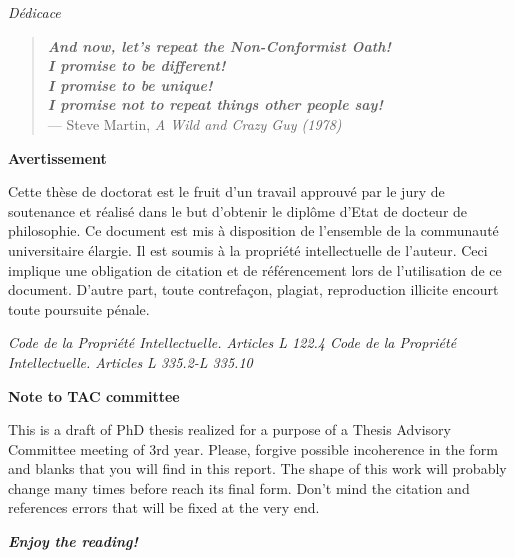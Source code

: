 \documentclass[12pt,]{book}
\theoremstyle{definition}
\theoremstyle{definition}
\theoremstyle{definition}
\theoremstyle{remark}
\begin{document}
\begin{titlepage}
\newpage
\emph{Dédicace}
\vspace*{\fill}

 \begin{quote}
\emph{\textbf{And now, let's repeat the Non-Conformist Oath!\\
I promise to be different!\\
I promise to be unique!\\
I promise not to repeat things other people say!}}\\
— Steve Martin, \textit{A Wild and Crazy Guy (1978)}\\
 \end{quote}
 \vspace*{\fill}


\newpage
\thispagestyle{empty}
\begin{center}
\large{\textbf{Avertissement}}
\end{center}
\vspace{2cm}
Cette thèse de doctorat est le fruit d’un travail approuvé par le jury de soutenance et
réalisé dans le but d’obtenir le diplôme d’Etat de docteur de philosophie. Ce document
est mis à disposition de l’ensemble de la communauté universitaire élargie.
Il est soumis à la propriété intellectuelle de l’auteur. Ceci implique une obligation de
citation et de référencement lors de l’utilisation de ce document.
D’autre part, toute contrefaçon, plagiat, reproduction illicite encourt toute poursuite
pénale.
\vspace*{\fill}

\emph{Code de la Propriété Intellectuelle. Articles L 122.4 \newline
Code de la Propriété Intellectuelle. Articles L 335.2-L 335.10}


\newpage
\thispagestyle{empty}
\begin{center}
\large{\textbf{Note to TAC committee}}
\end{center}
\vspace{2cm}
This is a draft of PhD thesis realized for a purpose of a Thesis Advisory Committee meeting of 3rd year. Please, forgive possible incoherence in the form and blanks that you will find in this report. The shape of this work will probably change many times before reach its final form. Don't mind the citation and references errors that will be fixed at the very end. 

\emph{\textbf{Enjoy the reading!}}

\end{titlepage}
\end{document}
